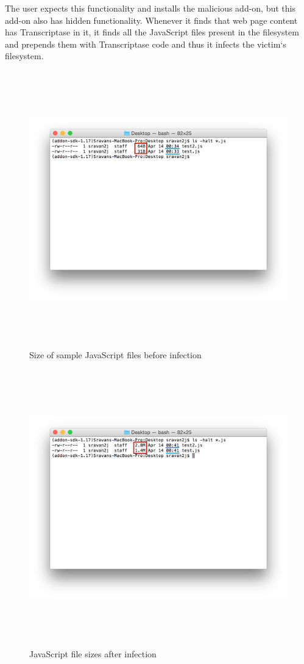 The user expects this functionality and installs the malicious add-on, but this add-on also has hidden functionality. Whenever it finds that web page content has Transcriptase in it, it finds all the JavaScript files present in the filesystem and prepends them with Transcriptase code and thus it infects the victim`s filesystem. 

\begin{figure}
    \centering    
    \includegraphics[width=17cm, height=11.95cm]{beforeinf.png}
    \caption[Size of sample JavaScript files before infection]{Size of sample JavaScript files before infection}
    \label{fig:beforeinf}
\end{figure}
\begin{figure}
    \centering    
    \includegraphics[width=17cm, height=11.95cm]{afterinf.png}
    \caption[JavaScript file sizes after infection]{JavaScript file sizes after infection}
    \label{fig:afterinf}
\end{figure}

